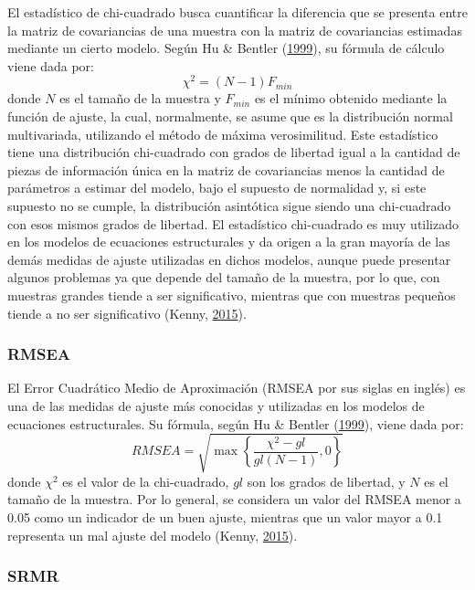 \documentclass[
  english]{revcoles}
\begin{document}
El estadístico de chi-cuadrado busca cuantificar la diferencia que se
presenta entre la matriz de covariancias de una muestra con la matriz de
covariancias estimadas mediante un cierto modelo. Según Hu \& Bentler
(\protect\hyperlink{ref-Hu1999}{1999}), su fórmula de cálculo viene dada
por: \[
  \chi^2 = (N-1) F_{min}
\] donde \(N\) es el tamaño de la muestra y \(F_{min}\) es el mínimo
obtenido mediante la función de ajuste, la cual, normalmente, se asume
que es la distribución normal multivariada, utilizando el método de
máxima verosimilitud. Este estadístico tiene una distribución
chi-cuadrado con grados de libertad igual a la cantidad de piezas de
información única en la matriz de covariancias menos la cantidad de
parámetros a estimar del modelo, bajo el supuesto de normalidad y, si
este supuesto no se cumple, la distribución asintótica sigue siendo una
chi-cuadrado con esos mismos grados de libertad. El estadístico
chi-cuadrado es muy utilizado en los modelos de ecuaciones estructurales
y da origen a la gran mayoría de las demás medidas de ajuste utilizadas
en dichos modelos, aunque puede presentar algunos problemas ya que
depende del tamaño de la muestra, por lo que, con muestras grandes
tiende a ser significativo, mientras que con muestras pequeños tiende a
no ser significativo (Kenny, \protect\hyperlink{ref-Kenny2015}{2015}).

\subsubsection{RMSEA}

El Error Cuadrático Medio de Aproximación (RMSEA por sus siglas en
inglés) es una de las medidas de ajuste más conocidas y utilizadas en
los modelos de ecuaciones estructurales. Su fórmula, según Hu \& Bentler
(\protect\hyperlink{ref-Hu1999}{1999}), viene dada por: \[
  RMSEA = \sqrt{\max\left\{\frac{\chi^2 - gl}{gl (N-1)} , 0 \right\}}
\] donde \(\chi^2\) es el valor de la chi-cuadrado, \(gl\) son los
grados de libertad, y \(N\) es el tamaño de la muestra. Por lo general,
se considera un valor del RMSEA menor a 0.05 como un indicador de un
buen ajuste, mientras que un valor mayor a 0.1 representa un mal ajuste
del modelo (Kenny, \protect\hyperlink{ref-Kenny2015}{2015}).

\subsubsection{SRMR}
\end{document}
